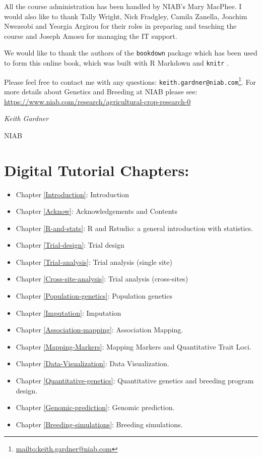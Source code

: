 \documentclass[
]{book}
\renewcommand{\href}[2]{#2\footnote{\url{#1}}}
\begin{document}
All the course administration has been handled by NIAB's Mary MacPhee. I would also like to thank Tally Wright, Nick Fradgley, Camila Zanella, Joachim Nwezeobi and Yeorgia Argirou for their roles in preparing and teaching the course and Joseph Amosu for managing the IT support.

We would like to thank the authors of the \texttt{bookdown} package \citep{R-bookdown} which has been used to form this online book, which was built with R Markdown and \texttt{knitr} \citep{xie2015}.

Please feel free to contact me with any questions: \href{mailto:keith.gardner@niab.com}{\nolinkurl{keith.gardner@niab.com}}. For more details about Genetics and Breeding at NIAB please see: \url{https://www.niab.com/research/agricultural-crop-research-0}

\emph{Keith Gardner}

NIAB

\hypertarget{digital-tutorial-chapters}{%
\section{Digital Tutorial Chapters:}\label{digital-tutorial-chapters}}

\begin{itemize}
\item
  Chapter \ref{Introduction}: Introduction
\item
  Chapter \ref{Acknow}: Acknowledgements and Contents
\item
  Chapter \ref{R-and-stats}: R and Rstudio: a general introduction with statistics.
\item
  Chapter \ref{Trial-design}: Trial design
\item
  Chapter \ref{Trial-analysis}: Trial analysis (single site)
\item
  Chapter \ref{Cross-site-analysis}: Trial analysis (cross-sites)
\item
  Chapter \ref{Population-genetics}: Population genetics
\item
  Chapter \ref{Imputation}: Imputation
\item
  Chapter \ref{Association-mapping}: Association Mapping.
\item
  Chapter \ref{Mapping-Markers}: Mapping Markers and Quantitative Trait Loci.
\item
  Chapter \ref{Data-Visualization}: Data Visualization.
\item
  Chapter \ref{Quantitative-genetics}: Quantitative genetics and breeding program design.
\item
  Chapter \ref{Genomic-prediction}: Genomic prediction.
\item
  Chapter \ref{Breeding-simulations}: Breeding simulations.
\end{itemize}
\end{document}
